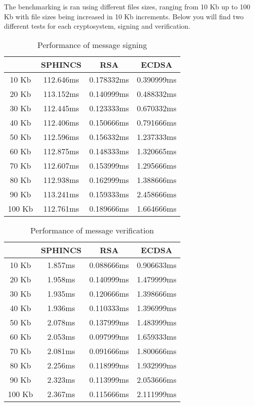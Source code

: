 \documentclass[]{scrartcl}
\begin{document}
The benchmarking is ran using different files sizes, ranging from 10 Kb up to 100 Kb with file sizes being increased in 10 Kb increments. Below you will find two different tests for each cryptosystem, signing and verification.

\begin{table} [H]
	\centering
	\caption{Performance of message signing}
	\begin{tabular}{|c|c|c|c|}
		\hline 
		& SPHINCS & RSA & ECDSA \\ 
		\hline 
		10 Kb & 112.646ms & 0.178332ms & 0.390999ms \\ 
		\hline 
		20 Kb & 113.152ms & 0.140999ms & 0.488332ms \\ 
		\hline 
		30 Kb & 112.445ms & 0.123333ms & 0.670332ms \\ 
		\hline 
		40 Kb & 112.406ms & 0.150666ms & 0.791666ms \\ 
		\hline 
		50 Kb & 112.596ms & 0.156332ms & 1.237333ms \\ 
		\hline 
		60 Kb & 112.875ms & 0.148333ms & 1.320665ms \\ 
		\hline 
		70 Kb & 112.607ms & 0.153999ms & 1.295666ms \\ 
		\hline 
		80 Kb & 112.938ms & 0.162999ms & 1.388666ms \\ 
		\hline 
		90 Kb & 113.241ms & 0.159333ms & 2.458666ms \\ 
		\hline 
		100 Kb & 112.761ms & 0.189666ms & 1.664666ms \\ 
		\hline 
	\end{tabular} 
\end{table}

\begin{table} [H]
	\centering
	\caption{Performance of message verification}
	\begin{tabular}{|c|c|c|c|}
		\hline 
		& SPHINCS & RSA & ECDSA \\ 
		\hline 
		10 Kb & 1.857ms & 0.088666ms & 0.906633ms \\ 
		\hline 
		20 Kb & 1.958ms & 0.140999ms & 1.479999ms \\ 
		\hline 
		30 Kb & 1.935ms & 0.120666ms & 1.398666ms \\ 
		\hline 
		40 Kb & 1.936ms & 0.110333ms & 1.396999ms \\ 
		\hline 
		50 Kb & 2.078ms & 0.137999ms & 1.483999ms \\ 
		\hline 
		60 Kb & 2.053ms & 0.097999ms & 1.659333ms \\ 
		\hline 
		70 Kb & 2.081ms & 0.091666ms & 1.800666ms \\ 
		\hline 
		80 Kb & 2.256ms & 0.118999ms & 1.932999ms \\ 
		\hline 
		90 Kb & 2.323ms & 0.113999ms & 2.053666ms \\ 
		\hline 
		100 Kb & 2.367ms & 0.115666ms & 2.111999ms \\ 
		\hline 
	\end{tabular} 
\end{table}
\end{document}
